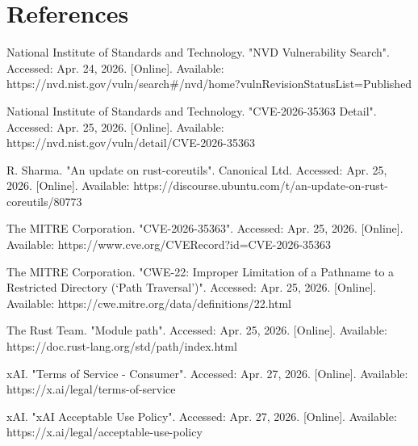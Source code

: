\documentclass[titlepage]{article}
\begin{document}
    \newpage
    
    \section*{\centering References}

    National Institute of Standards and Technology. "NVD Vulnerability
    Search". Accessed: Apr. 24, 2026. [Online]. Available:
    https://nvd.nist.gov/vuln/search\#/nvd/home?vulnRevisionStatusList=Published
    
    \vspace{0.5em}

    National Institute of Standards and Technology. "CVE-2026-35363
    Detail". Accessed: Apr. 25, 2026. [Online]. Available:
    https://nvd.nist.gov/vuln/detail/CVE-2026-35363

    \vspace{0.5em}

    R. Sharma. "An update on rust-coreutils". Canonical Ltd. Accessed:
    Apr. 25, 2026. [Online]. Available:
    https://discourse.ubuntu.com/t/an-update-on-rust-coreutils/80773

    \vspace{0.5em}

    The MITRE Corporation. "CVE-2026-35363". Accessed: Apr. 25, 2026.
    [Online]. Available: https://www.cve.org/CVERecord?id=CVE-2026-35363

    \vspace{0.5em}

    The MITRE Corporation. "CWE-22: Improper Limitation of a Pathname to a
    Restricted Directory (`Path Traversal')". Accessed: Apr. 25, 2026.
    [Online]. Available: https://cwe.mitre.org/data/definitions/22.html

    \vspace{0.5em}

    The Rust Team. "Module path". Accessed: Apr. 25, 2026. [Online].
    Available: https://doc.rust-lang.org/std/path/index.html

    \vspace{0.5em}

    xAI. "Terms of Service - Consumer". Accessed: Apr. 27, 2026. [Online]. 
    Available: https://x.ai/legal/terms-of-service

    \vspace{0.5em}

    xAI. "xAI Acceptable Use Policy". Accessed: Apr. 27, 2026. [Online]. 
    Available: https://x.ai/legal/acceptable-use-policy
\end{document}
